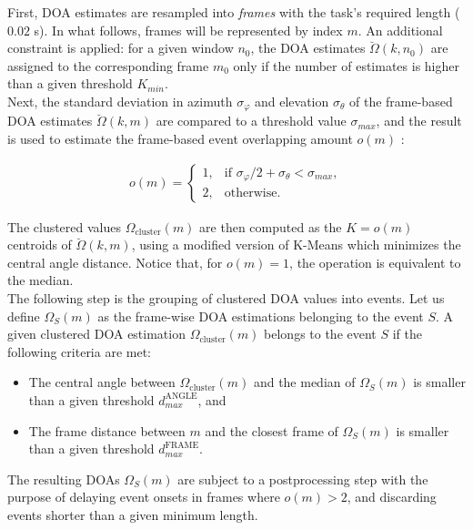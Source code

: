 First, DOA estimates are resampled into \textit{frames} with the task's required length ($0.02$ s). In what follows, frames will be represented by index $m$. 
An additional constraint is applied: for a given window $n_0$, the DOA estimates $\breve{\Omega}(k,n_0)$ are assigned to the corresponding frame $m_0$ only if the number of estimates is higher than a given threshold $K_{min}$.\\

Next, the standard deviation in azimuth $\sigma_{\varphi}$ and elevation $\sigma_{\theta}$ of the frame-based DOA estimates $\breve{\Omega}(k,m)$ are compared to a threshold value $\sigma_{max}$, and the result is used to estimate the frame-based event overlapping amount $o(m)$ :

\begin{equation}
\begin{aligned}
	o(m) =  \begin{cases}
    		1, &\text{if } \sigma_{\varphi}/2 + \sigma_{\theta} < \sigma_{max},\\
    		2, &\text{otherwise}.
    \end{cases}    		
\end{aligned}
\end{equation}

The clustered values $\Omega_{\text{cluster}}(m)$ are then computed as the $K=o(m)$ centroids of $\breve{\Omega}(k,m)$, using a modified version of K-Means which minimizes the central angle distance. Notice that, for $o(m)=1$, the operation is equivalent to the median.\\

The following step is the grouping of clustered DOA values into events.
Let us define $\Omega_S(m)$ as the frame-wise DOA estimations belonging to the event $S$. A given clustered DOA estimation $\Omega_{\text{cluster}}(m)$ belongs to the event $S$ if the following criteria are met:
\begin{itemize}
    \item The central angle between  $\Omega_{\text{cluster}}(m)$ and the median of $\Omega_S(m)$ is smaller than a given threshold $d_{max}^\text{ANGLE}$, and
    \item The frame distance between $m$ and the closest frame of $\Omega_S(m)$ is smaller than a given threshold $d_{max}^\text{FRAME}$.
\end{itemize}

The resulting DOAs $\Omega_S(m)$ are subject to a postprocessing step with the purpose of 
delaying event onsets in frames where $o(m) > 2$, and discarding events shorter than a given minimum length. 

